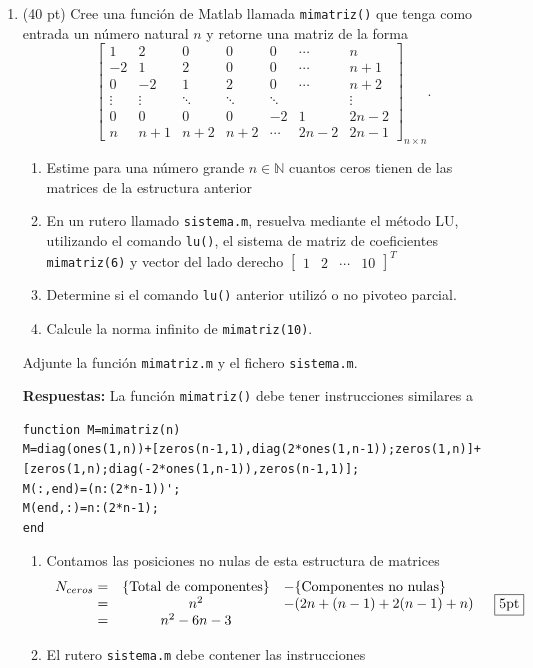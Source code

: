 \documentclass[11pt]{article}
\begin{document}
\begin{enumerate}
\item (40 pt) Cree una funci\'on de Matlab llamada \texttt{mimatriz()} que tenga como entrada un n\'umero natural $n$ y retorne una matriz de la forma
$$
\begin{bmatrix}
1 		& 2 		&  0 		& 0 		& 0 	&\cdots 	&n   \\
-2 		& 1 		& 2 		& 0 		& 0 	&\cdots 	&n+1 \\
0		&-2 		& 1 		& 2  		& 0 	&\cdots 	&n+2 \\
\vdots 	& \vdots 	& \ddots 	& \ddots 	& \ddots&			& \vdots \\
0		& 0			&0			& 0			&-2		& 1 		&2n-2\\
n		& n+1		& n+2 		& n+2		&  \cdots	&2n-2	& 2n-1
\end{bmatrix}_{n\times n}.
$$

\begin{enumerate}
	\item Estime para una n\'umero grande $n\in\mathbb{N}$ cuantos ceros tienen de las matrices de la estructura anterior
    \item En un rutero llamado \texttt{sistema.m}, resuelva mediante el método LU, utilizando el comando \texttt{lu()}, el sistema de matriz de coeficientes \texttt{mimatriz(6)} y vector del lado derecho $\begin{bmatrix} 1 & 2 & \cdots & 10\end{bmatrix}^T$   
    \item Determine si el comando \texttt{lu()} anterior utiliz\'o o no pivoteo parcial.
    
    \item Calcule la norma infinito de \texttt{mimatriz(10)}.
\end{enumerate}
Adjunte la funci\'on \texttt{mimatriz.m} y el fichero \texttt{sistema.m}.

 \textbf{Respuestas:} 
 La funci\'on \texttt{mimatriz()} debe tener instrucciones similares a
 
 \begin{minipage}{0.8\textwidth}
\begin{lstlisting}
function M=mimatriz(n)
M=diag(ones(1,n))+[zeros(n-1,1),diag(2*ones(1,n-1));zeros(1,n)]+[zeros(1,n);diag(-2*ones(1,n-1)),zeros(n-1,1)];
M(:,end)=(n:(2*n-1))';
M(end,:)=n:(2*n-1);
end
\end{lstlisting}
\end{minipage}
\hfill \fbox{20pt}
 
\begin{enumerate}
	\item Contamos las posiciones no nulas de esta estructura de matrices
  $$
  \begin{array}{rcl}
  N_{ceros}	= &\{\text{Total de componentes}\} &-\{\text{Componentes no nulas}\}\\
  			= & n^2	&-(2n+(n-1)+2(n-1)+n)\\
            = & n^2 -6n-3
 \end{array} \quad \fbox{5pt}
  $$
  \item El rutero \texttt{sistema.m} debe contener las instrucciones
  

\end{enumerate}
\end{enumerate}
\end{document}
